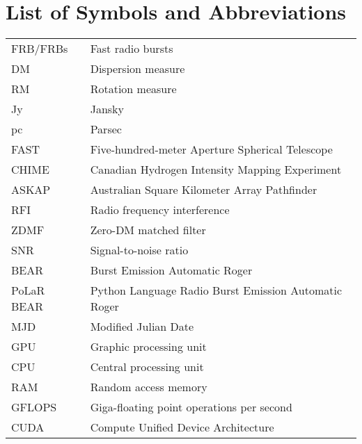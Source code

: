 \chapter{List of Symbols and Abbreviations}
\begin{tabular}{l @{ : } l}
FRB/FRBs & Fast radio bursts\\
DM & Dispersion measure\\
RM & Rotation measure\\
Jy & Jansky\\
pc & Parsec\\
FAST & Five-hundred-meter Aperture Spherical Telescope\\
CHIME & Canadian Hydrogen Intensity Mapping Experiment\\
ASKAP & Australian Square Kilometer Array Pathfinder\\
RFI & Radio frequency interference\\
ZDMF & Zero-DM matched filter\\
SNR & Signal-to-noise ratio\\
BEAR & Burst Emission Automatic Roger\\
PoLaR BEAR & Python Language Radio Burst Emission Automatic Roger\\
MJD & Modified Julian Date\\
GPU & Graphic processing unit\\
CPU & Central processing unit\\
RAM & Random access memory\\
GFLOPS & Giga-floating point operations per second\\
CUDA & Compute Unified Device Architecture
\end{tabular}\clearpage
